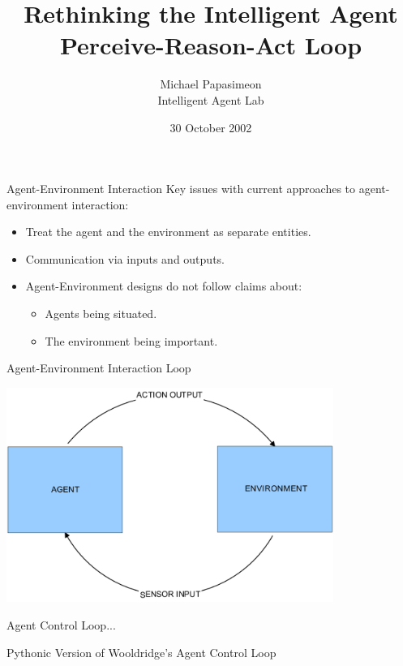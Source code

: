 \documentclass[aspectratio=1610,xcolor=dvipsnames,t]{beamer}
\title[Intelligent Agents]{Rethinking the Intelligent Agent \\ Perceive-Reason-Act Loop}
\author[Michael Papasimeon]{Michael Papasimeon \\[0.2cm] \tiny{Intelligent Agent Lab} }
\date{30 October 2002}
\newcommand{\showcode}[1]{\begin{mdframed}[style=code] %
                          \end{mdframed}%
}
\begin{document}
\begin{frame}
    \maketitle
\end{frame} 

\begin{frame}{Agent-Environment Interaction} 
    Key issues with current approaches to agent-environment interaction:
    \begin{itemize}
        \item Treat the agent and the environment as separate entities.
        \item Communication via inputs and outputs.
        \item Agent-Environment designs do not follow claims about:
            \begin{itemize}
                \item Agents being situated.
                \item The environment being important. 
            \end{itemize} 
    \end{itemize} 
\end{frame} 

\begin{frame}{Agent-Environment Interaction Loop} 
    \begin{center}
        \includegraphics[width=0.8\textwidth]{loop} 
    \end{center} 
\end{frame} 

\begin{frame}{Agent Control Loop...}
    \begin{block}{Pythonic Version of Wooldridge's Agent Control Loop} 
        \showcode{wooldridge.py} 
    \end{block} 
\end{frame} 
\end{document}
